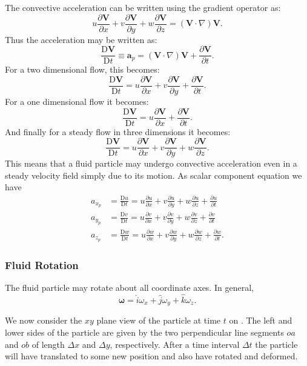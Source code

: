 The convective acceleration can be written using the gradient operator as:
\[ 
u \frac{\partial \textbf{V}}{\partial x} + v \frac{\partial \textbf{V}}{\partial y} + w \frac{\partial \textbf{V}}{\partial z} = \left( \textbf{V} \cdot \nabla  \right) \textbf{V}
.\]
Thus the acceleration may be written as:
\[ 
\frac{\mathrm{D}\textbf{V}}{\mathrm{D}t} \equiv \textbf{a}_p = \left( \textbf{V} \cdot \nabla  \right)\textbf{V} + \frac{\partial \textbf{V}}{\partial t}
.\]
For a two dimensional flow, this becomes:
\[ 
\frac{\mathrm{D}\textbf{V}}{\mathrm{D}t} = u \frac{\partial \textbf{V}}{\partial x} + v \frac{\partial \textbf{V}}{\partial y} + \frac{\partial \textbf{V}}{\partial t}
.\]
For a one dimensional flow it becomes:
\[ 
  \frac{\mathrm{D}\textbf{V}}{\mathrm{D}t} = u \frac{\partial \textbf{V}}{\partial x} + \frac{\partial \textbf{V}}{\partial t} 
.\]
And finally for a steady flow in three dimensions it becomes:
\[ 
\frac{\mathrm{D}\textbf{V}}{\mathrm{D}t} = u \frac{\partial \textbf{V}}{\partial x} + v \frac{\partial \textbf{V}}{\partial y} + w \frac{\partial \textbf{V}}{\partial z}
.\]
This means that a fluid particle may undergo convective acceleration even in a steady velocity field simply due to its motion. As scalar component equation we have
\begin{align*}
  a_{x_p} &= \frac{\mathrm{D}u}{\mathrm{D}t} = u \frac{\partial u}{\partial x} + v \frac{\partial u}{\partial y} + w \frac{\partial u}{\partial z} + \frac{\partial u}{\partial t} \\
    a_{y_p} &= \frac{\mathrm{D}v}{\mathrm{D}t} = u \frac{\partial v}{\partial x} + v \frac{\partial v}{\partial y} + w \frac{\partial v}{\partial z} + \frac{\partial v}{\partial t} \\
  a_{z_p} &= \frac{\mathrm{D}w}{\mathrm{D}t} = u \frac{\partial w}{\partial x} + v \frac{\partial w}{\partial y} + w \frac{\partial w}{\partial z} + \frac{\partial w}{\partial t}
.\end{align*}


\subsubsection{Fluid Rotation} \label{sec:rot}
The fluid particle may rotate about all coordinate axes. In general,
\[ 
  \boldsymbol{\omega} = \hat{i} \omega_x + \hat{j} \omega_y + \hat{k} \omega_z
.\]

We now consider the $xy$ plane view of the particle at time $t$ on . The left and lower sides of the particle are given by the two perpendicular line segments $oa$ and $ob$ of length $\Delta x$ and $\Delta y$, respectively. After a time interval $\Delta t$ the particle will have translated to some new position and also have rotated and deformed.


